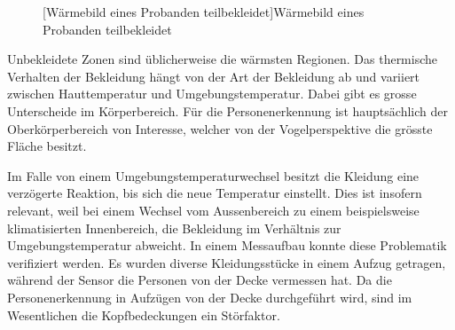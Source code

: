 \begin{figure}[!ht]
\begin{minipage}[b]{0.45\linewidth}
		[Wärmebild eines Probanden teilbekleidet]{Wärmebild eines Probanden teilbekleidet}
		\label{fig:Waermebild2}	
	\end{minipage}
\end{figure}

 Unbekleidete Zonen sind üblicherweise die wärmsten Regionen. Das thermische Verhalten der Bekleidung hängt von der Art der Bekleidung ab und variiert zwischen Hauttemperatur und Umgebungstemperatur. Dabei gibt es grosse Unterscheide im Körperbereich. Für die Personenerkennung ist hauptsächlich der Oberkörperbereich von Interesse, welcher von der Vogelperspektive die grösste Fläche besitzt.
 
 Im Falle von einem Umgebungstemperaturwechsel besitzt die Kleidung eine verzögerte Reaktion, bis sich die neue Temperatur einstellt. 
 Dies ist insofern relevant, weil bei einem Wechsel vom Aussenbereich zu einem beispielsweise klimatisierten Innenbereich, die Bekleidung im Verhältnis zur Umgebungstemperatur abweicht. In einem Messaufbau konnte diese Problematik verifiziert werden. Es wurden diverse Kleidungsstücke in einem Aufzug getragen, während der Sensor die Personen von der Decke vermessen hat. Da die Personenerkennung in Aufzügen von der Decke durchgeführt wird, sind im Wesentlichen die Kopfbedeckungen ein Störfaktor.

